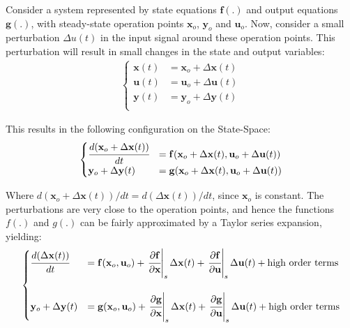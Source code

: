 \documentclass[a4paper,11pt]{book}
\numberwithin{figure}{chapter}
\numberwithin{equation}{chapter}
\numberwithin{table}{chapter}
\theoremstyle{definition}
\begin{document}
Consider a system represented by state equations $\mathbf{f}(.)$ and output equations $\mathbf{g}(.)$, with steady-state operation points $\mathbf{x}_o$, $\mathbf{y}_o$ and $\mathbf{u}_o$. Now, consider a small perturbation $\Delta u(t)$ in the input signal around these operation points. This perturbation will result in small changes in the state and output variables:
\begin{align}
\begin{cases}
	\mathbf{x}(t) &= \mathbf{x}_o + \Delta \mathbf{x}(t) \\
	\mathbf{u}(t) &= \mathbf{u}_o + \Delta \mathbf{u}(t) \\
	\mathbf{y}(t) &= \mathbf{y}_o + \Delta \mathbf{y}(t) \\
\end{cases}
\end{align}

This results in the following configuration on the State-Space:
\begin{align}
\begin{cases}
	\cfrac{d(\mathbf{x}_o + \Delta \mathbf{x}(t))}{dt} &= \mathbf{f}(\mathbf{x}_o + \Delta \mathbf{x}(t), \mathbf{u}_o + \Delta \mathbf{u}(t) ) \\
	\mathbf{y}_o + \Delta \mathbf{y}(t) &= \mathbf{g}(\mathbf{x}_o + \Delta \mathbf{x}(t), \mathbf{u}_o + \Delta \mathbf{u}(t) ) \\
\end{cases}
\end{align}

Where $d(\mathbf{x}_o + \Delta \mathbf{x}(t)) / dt = d(\Delta \mathbf{x}(t)) / dt$, since $\mathbf{x}_o$ is constant. The perturbations are very close to the operation points, and hence the functions $f(.)$ and $g(.)$ can be fairly approximated by a Taylor series expansion, yielding:
\begin{align}
\begin{cases}
	\cfrac{d(\Delta \mathbf{x}(t))}{dt} &= \mathbf{f}(\mathbf{x}_o, \mathbf{u}_o) + \left. \cfrac{\partial \mathbf{f}}{\partial \mathbf{x}}\right\vert_{s} \Delta \mathbf{x}(t) + \left. \cfrac{\partial \mathbf{f}}{\partial \mathbf{u}}\right\vert_{s}  \Delta \mathbf{u}(t) + \text{high order terms} \\ \\
	\mathbf{y}_o + \Delta \mathbf{y}(t) &= \mathbf{g}(\mathbf{x}_o, \mathbf{u}_o) + \left. \cfrac{\partial \mathbf{g}}{\partial \mathbf{x}}\right\vert_{s} \Delta \mathbf{x}(t) + \left. \cfrac{\partial \mathbf{g}}{\partial \mathbf{u}}\right\vert_{s}  \Delta \mathbf{u}(t) + \text{high order terms} \\
\end{cases}
\end{align}
\end{document}
